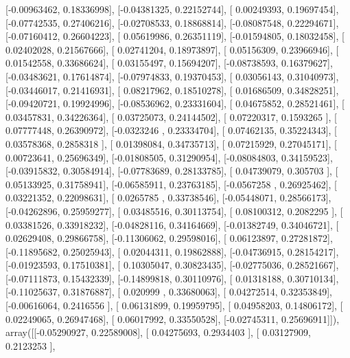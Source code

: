 \documentclass{article}
\begin{document}
       [-0.00963462,  0.18336998],
       [-0.04381325,  0.22152744],
       [ 0.00249393,  0.19697454],
       [-0.07742535,  0.27406216],
       [-0.02708533,  0.18868814],
       [-0.08087548,  0.22294671],
       [-0.07160412,  0.26604223],
       [ 0.05619986,  0.26351119],
       [-0.01594805,  0.18032458],
       [ 0.02402028,  0.21567666],
       [ 0.02741204,  0.18973897],
       [ 0.05156309,  0.23966946],
       [ 0.01542558,  0.33686624],
       [ 0.03155497,  0.15694207],
       [-0.08738593,  0.16379627],
       [-0.03483621,  0.17614874],
       [-0.07974833,  0.19370453],
       [ 0.03056143,  0.31040973],
       [-0.03446017,  0.21416931],
       [ 0.08217962,  0.18510278],
       [ 0.01686509,  0.34828251],
       [-0.09420721,  0.19924996],
       [-0.08536962,  0.23331604],
       [ 0.04675852,  0.28521461],
       [ 0.03457831,  0.34226364],
       [ 0.03725073,  0.24144502],
       [ 0.07220317,  0.1593265 ],
       [ 0.07777448,  0.26390972],
       [-0.0323246 ,  0.23334704],
       [ 0.07462135,  0.35224343],
       [ 0.03578368,  0.2858318 ],
       [ 0.01398084,  0.34735713],
       [ 0.07215929,  0.27045171],
       [ 0.00723641,  0.25696349],
       [-0.01808505,  0.31290954],
       [-0.08084803,  0.34159523],
       [-0.03915832,  0.30584914],
       [-0.07783689,  0.28133785],
       [ 0.04739079,  0.305703  ],
       [ 0.05133925,  0.31758941],
       [-0.06585911,  0.23763185],
       [-0.0567258 ,  0.26925462],
       [ 0.03221352,  0.22098631],
       [ 0.0265785 ,  0.33738546],
       [-0.05448071,  0.28566173],
       [-0.04262896,  0.25959277],
       [ 0.03485516,  0.30113754],
       [ 0.08100312,  0.2082295 ],
       [ 0.03381526,  0.33918232],
       [-0.04828116,  0.34164669],
       [-0.01382749,  0.34046721],
       [ 0.02629408,  0.29866758],
       [-0.11306062,  0.29598016],
       [ 0.06123897,  0.27281872],
       [-0.11895682,  0.25025943],
       [ 0.02044311,  0.19862888],
       [-0.04736915,  0.28154217],
       [-0.01923593,  0.17510381],
       [ 0.10305047,  0.30823435],
       [-0.02775036,  0.28521667],
       [-0.07111873,  0.15432339],
       [-0.14899818,  0.30110976],
       [ 0.01318188,  0.30710134],
       [-0.11025637,  0.31876887],
       [ 0.020999  ,  0.33680063],
       [ 0.04272514,  0.32353849],
       [-0.00616064,  0.2416556 ],
       [ 0.06131899,  0.19959795],
       [ 0.04958203,  0.14806172],
       [ 0.02249065,  0.26947468],
       [ 0.06017992,  0.33550528],
       [-0.02745311,  0.25696911]]), array([[-0.05290927,  0.22589008],
       [ 0.04275693,  0.2934403 ],
       [ 0.03127909,  0.2123253 ],
\end{document}

